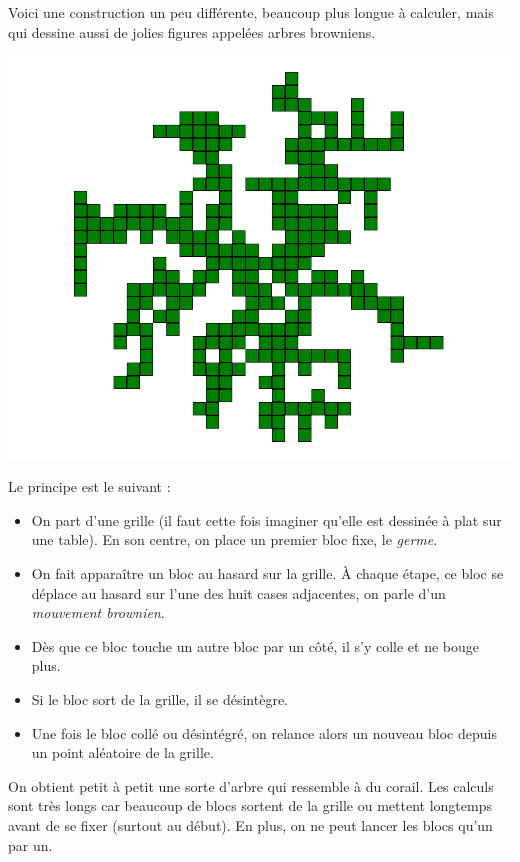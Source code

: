\documentclass[11pt,class=report,crop=false]{standalone}
\begin{document}
\begin{cours}

Voici une construction un peu différente, beaucoup plus longue à calculer, mais qui dessine aussi de jolies figures appelées \og{}arbres browniens\fg{}.

\begin{center}
\includegraphics[scale=0.28]{ecran-alea-arbre1}
\end{center}


Le principe est le suivant :
\begin{itemize}
  \item On part d'une grille (il faut cette fois imaginer qu'elle est dessinée à plat sur une table). En son centre, on place un premier bloc fixe, le \emph{germe}.
  
  \item On fait apparaître un bloc au hasard sur la grille. À chaque étape, ce bloc se déplace au hasard sur l'une des huit cases adjacentes, on parle d'un \emph{mouvement brownien}. 

  \item Dès que ce bloc touche un autre bloc par un côté, il s'y colle et ne bouge plus.

  \item Si le bloc sort de la grille, il se désintègre.
  
  \item Une fois le bloc collé ou désintégré, on relance alors un nouveau bloc depuis un point aléatoire de la grille.
\end{itemize}



On obtient petit à petit une sorte d'arbre qui ressemble à du corail. Les calculs sont très longs car beaucoup de blocs sortent de la grille ou mettent longtemps avant de se fixer (surtout au début). En plus, on ne peut lancer les blocs qu'un par un.

\end{cours}
\end{document}
